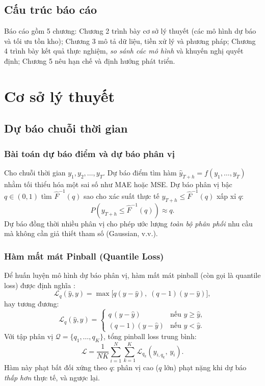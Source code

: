 \documentclass[12pt, a4paper]{report}
\begin{document}
\section{Cấu trúc báo cáo}

Báo cáo gồm 5 chương: Chương 2 trình bày cơ sở lý thuyết (các mô hình dự báo và tối ưu tồn kho); Chương 3 mô tả dữ liệu, tiền xử lý và phương pháp; Chương 4 trình bày kết quả thực nghiệm, \textit{so sánh các mô hình} và khuyến nghị quyết định; Chương 5 nêu hạn chế và định hướng phát triển.

\chapter{Cơ sở lý thuyết}

\section{Dự báo chuỗi thời gian}

\subsection{Bài toán dự báo điểm và dự báo phân vị}

Cho chuỗi thời gian $y_1, y_2, \ldots, y_T$. Dự báo điểm tìm hàm $\hat{y}_{T+h} = f(y_1,\ldots,y_T)$ nhằm tối thiểu hóa một sai số như MAE hoặc MSE. Dự báo phân vị bậc $q \in (0,1)$ tìm $\hat{F}^{-1}(q)$ sao cho xác suất thực tế $y_{T+h} \leq \hat{F}^{-1}(q)$ xấp xỉ $q$:
\begin{equation}
  P\!\left(y_{T+h} \leq \hat{F}^{-1}(q)\right) \approx q.
\end{equation}
Dự báo đồng thời nhiều phân vị cho phép ước lượng \textit{toàn bộ phân phối} nhu cầu mà không cần giả thiết tham số (Gaussian, v.v.).

\subsection{Hàm mất mát Pinball (Quantile Loss)}

Để huấn luyện mô hình dự báo phân vị, hàm mất mát pinball (còn gọi là quantile loss) được định nghĩa \cite{koenker1978regression}:
\begin{equation}
  \mathcal{L}_q(\hat{y}, y) = \max\!\bigl[q(y - \hat{y}),\; (q-1)(y - \hat{y})\bigr],
\end{equation}
hay tương đương:
\begin{equation}
  \mathcal{L}_q(\hat{y}, y) =
  \begin{cases}
    q\,(y - \hat{y})   & \text{nếu } y \geq \hat{y}, \\
    (q-1)(y - \hat{y}) & \text{nếu } y < \hat{y}.
  \end{cases}
\end{equation}
Với tập phân vị $\mathcal{Q} = \{q_1, \ldots, q_K\}$, tổng pinball loss trung bình:
\begin{equation}
  \mathcal{L} = \frac{1}{NK} \sum_{i=1}^{N} \sum_{k=1}^{K} \mathcal{L}_{q_k}(\hat{y}_{i,q_k},\, y_i).
\end{equation}
Hàm này phạt bất đối xứng theo $q$: phân vị cao ($q$ lớn) phạt nặng khi dự báo \textit{thấp hơn} thực tế, và ngược lại.
\end{document}
